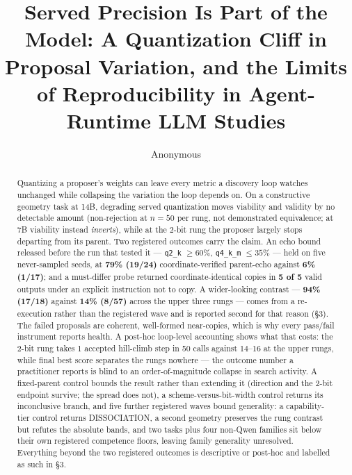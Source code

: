\documentclass{article}
\title{Served Precision Is Part of the Model: A Quantization Cliff in
Proposal Variation, and the Limits of Reproducibility in Agent-Runtime
LLM Studies}
\author{\name Anonymous}
\begin{document}
\maketitle

\begin{abstract}
Quantizing a proposer's weights can leave every metric a discovery loop
watches unchanged while collapsing the variation the loop depends on. On a
constructive geometry task at 14B, degrading served quantization moves
viability and validity by no detectable amount (non-rejection at $n=50$ per
rung, not demonstrated equivalence; at 7B viability instead \emph{inverts}),
while at the 2-bit rung the proposer largely stops departing from its parent.
Two registered outcomes carry the claim. An echo bound released before the
run that tested it --- \texttt{q2\_k} $\geq 60\%$, \texttt{q4\_k\_m} $\leq
35\%$ --- held on five never-sampled seeds, at \textbf{79\% (19/24)}
coordinate-verified parent-echo against \textbf{6\% (1/17)}; and a
must-differ probe returned coordinate-identical copies in \textbf{5 of 5}
valid outputs under an explicit instruction not to copy. A wider-looking
contrast --- \textbf{94\% (17/18)} against \textbf{14\% (8/57)} across the
upper three rungs --- comes from a re-execution rather than the registered
wave and is reported second for that reason (\S3). The failed proposals are
coherent, well-formed near-copies, which is why every pass/fail instrument
reports health. A post-hoc loop-level accounting shows what that costs: the
2-bit rung takes 1 accepted hill-climb step in 50 calls against 14--16 at
the upper rungs, while final best score separates the rungs nowhere --- the
outcome number a practitioner reports is blind to an order-of-magnitude
collapse in search activity. A fixed-parent control bounds the result rather
than extending it (direction and the 2-bit endpoint survive; the spread does
not), a scheme-versus-bit-width control returns its inconclusive branch, and
five further registered waves bound generality: a capability-tier control
returns DISSOCIATION, a second geometry preserves the rung contrast but
refutes the absolute bands, and two tasks plus four non-Qwen families sit
below their own registered competence floors, leaving family generality
unresolved. Everything beyond the two registered outcomes is descriptive or
post-hoc and labelled as such in \S3.


\end{abstract}
\end{document}
